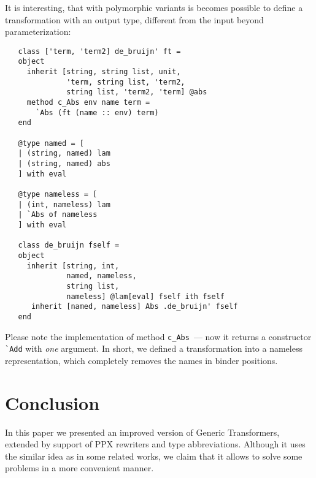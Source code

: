 \documentclass[submission,copyright,creativecommons]{eptcs}
\begin{document}
It is interesting, that with polymorphic variants is becomes possible to define a transformation with an output type, different from the input
beyond parameterization:

\begin{lstlisting}
   class ['term, 'term2] de_bruijn' ft =
   object
     inherit [string, string list, unit,
              'term, string list, 'term2,
              string list, 'term2, 'term] @abs
     method c_Abs env name term =
       `Abs (ft (name :: env) term) 
   end
     
   @type named = [
   | (string, named) lam
   | (string, named) abs
   ] with eval
                     
   @type nameless = [
   | (int, nameless) lam
   | `Abs of nameless
   ] with eval

   class de_bruijn fself =
   object
     inherit [string, int,
              named, nameless,
              string list,
              nameless] @lam[eval] fself ith fself
      inherit [named, nameless] Abs .de_bruijn' fself 
   end
\end{lstlisting}

Please note the implementation of method \lstinline{c_Abs}~--- now it returns a constructor \lstinline{`Add} with \emph{one}
argument. In short, we defined a transformation into a nameless representation, which completely removes the names in binder
positions.




\section{Conclusion}
In this paper we presented an improved version of Generic Transformers, extended by support of PPX rewriters and type abbreviations. Although it 
uses the similar idea as in some related works, we claim that it allows to solve some problems in a more convenient manner.
\end{document}
